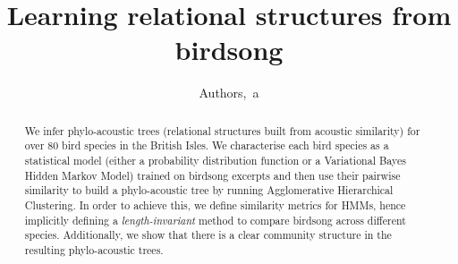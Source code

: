 \documentclass[pdftex,11pt,a4paper]{article}
\theoremstyle{definition}
\theoremstyle{remark}
\begin{document}
\title{Learning relational structures from birdsong}
\author{Authors,~a}

\maketitle


\begin{abstract}
We infer phylo-acoustic trees (relational structures built from acoustic similarity) for over 80 bird species in the British Isles. We characterise each bird species as a statistical model (either a probability distribution function or a Variational Bayes Hidden Markov Model) trained on birdsong excerpts and then use their pairwise similarity to build a phylo-acoustic tree by running Agglomerative Hierarchical Clustering. In order to achieve this, we define similarity metrics for HMMs, hence implicitly defining a \emph{length-invariant} method to compare birdsong across different species. Additionally, we show that there is a clear community structure in the resulting phylo-acoustic trees.
\end{abstract}
\end{document}
